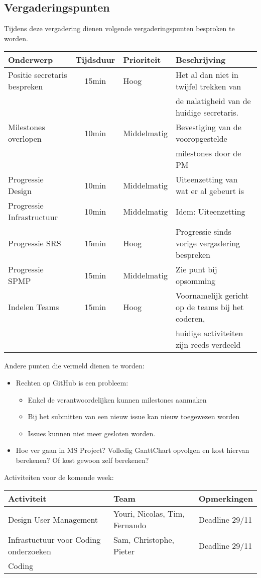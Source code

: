 \subsection{Vergaderingspunten}
Tijdens deze vergadering dienen volgende vergaderingspunten besproken te worden.
\begin{table} [H]
	\centering
	\begin{tabular} {l|cll}
		\textbf{Onderwerp} & \textbf{Tijdsduur} & \textbf{Prioriteit} & \textbf{Beschrijving} \\ %
		\hline
		Positie secretaris bespreken & 15min & Hoog & Het al dan niet in twijfel trekken van \\
					& & & de nalatigheid van de huidige secretaris. \\
		Milestones overlopen & 10min & Middelmatig & Bevestiging van de vooropgestelde \\
						& & & milestones door de PM \\
		Progressie Design & 10min & Middelmatig & Uiteenzetting van wat er al gebeurt is \\
		Progressie Infrastructuur & 10min & Middelmatig & Idem: Uiteenzetting \\
		Progressie SRS & 15min & Hoog & Progressie sinds vorige vergadering bespreken \\
		Progressie SPMP & 15min & Middelmatig & Zie punt bij opsomming \\
		Indelen Teams & 15min & Hoog & Voornamelijk gericht op de teams bij het coderen, \\
		 			& & & huidige activiteiten zijn reeds verdeeld \\
	\end{tabular}
\end{table}
Andere punten die vermeld dienen te worden:
\begin{itemize}
	\item
	{
		Rechten op GitHub is een probleem:
		\begin{itemize}
			\item Enkel de verantwoordelijken kunnen milestones aanmaken
			\item Bij het submitten van een nieuw issue kan nieuw toegewezen worden
			\item Issues kunnen niet meer gesloten worden.
		\end{itemize}	
	}
	\item
	{
		Hoe ver gaan in MS Project? Volledig GanttChart opvolgen en kost hiervan berekenen? Of kost gewoon zelf berekenen?
	}
\end{itemize}
Activiteiten voor de komende week:
\begin{table} [H]
	\centering
	\begin{tabular} {l|ll}
		\textbf{Activiteit} & \textbf{Team} & \textbf{Opmerkingen} \\
		\hline
		Design User Management & Youri, Nicolas, Tim, Fernando & Deadline 29/11 \\
		Infrastuctuur voor Coding onderzoeken & Sam, Christophe, Pieter & Deadline 29/11 \\
		Coding & & \\
	\end{tabular}
\end{table}
